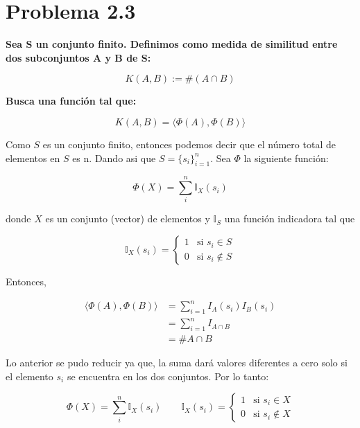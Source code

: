 \section*{Problema 2.3}

\textbf{Sea S un conjunto finito. Definimos como medida de similitud entre
    dos subconjuntos A y B de S:}

\begin{equation*}
    K(A,B) := \#(A \cap B)
\end{equation*}

\textbf{Busca una función tal que:}

\begin{equation*}
    K(A,B ) = \langle \Phi(A), \Phi(B)\rangle
\end{equation*}

Como $S$ es un conjunto finito, entonces podemos decir que el número total de elementos en $S$ es n. Dando asi que $S =\lbrace s_i \rbrace_{i=1}^n$. Sea $\Phi$ la siguiente función:

\begin{equation*}
    \Phi (X) = \sum_{i}^n \mathbb{I}_X(s_i)
\end{equation*}

donde $X$ es un conjunto (vector) de elementos y $\mathbb{I}_S$ una función indicadora tal que

\begin{equation*}
    \mathbb{I}_X(s_i) =
    \begin{cases}
        1 & \text{si }  s_i \in S    \\
        0 & \text{si } s_i \not\in S
    \end{cases}
\end{equation*}

Entonces,

\begin{align*}
    \langle \Phi(A) , \Phi(B)  \rangle & = \sum_{i=1}^n I_A(s_i) I_B(s_i) \\
                                       & = \sum_{i=1}^n I_{A\cap B}       \\
                                       & = \# A \cap B
\end{align*}

Lo anterior se pudo reducir ya que, la suma dará valores diferentes a cero solo si el elemento $s_i$ se encuentra en los dos conjuntos. Por lo tanto:

\begin{equation*}
    \Phi (X) = \sum_{i}^n \mathbb{I}_X(s_i) \qquad \mathbb{I}_X(s_i) =
    \begin{cases}
        1 & \text{si }  s_i \in X    \\
        0 & \text{si } s_i \not\in X
    \end{cases}
\end{equation*}